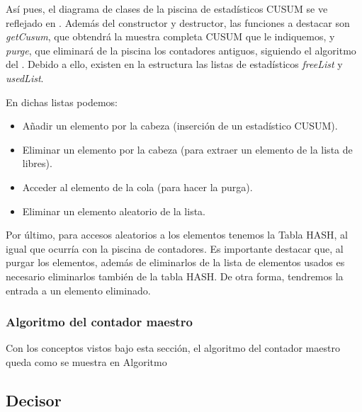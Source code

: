 Así pues, el diagrama de clases de la piscina de estadísticos \gls{CUSUM} se ve reflejado en . 
Además del constructor y destructor, las funciones a destacar son \emph{getCusum}, que obtendrá la muestra completa 
\gls{CUSUM} que le indiquemos, y \emph{purge}, que eliminará de la piscina los contadores antiguos, siguiendo el 
algoritmo del . Debido a ello, existen en la estructura las listas de estadísticos \emph{freeList} 
y \emph{usedList}.

En dichas listas podemos:
\begin{itemize}
 \item Añadir un elemento por la cabeza (inserción de un estadístico CUSUM).
 \item Eliminar un elemento por la cabeza (para extraer un elemento de la lista de libres).
 \item Acceder al elemento de la cola (para hacer la purga).
 \item Eliminar un elemento aleatorio de la lista.
\end{itemize}

Por último, para accesos aleatorios a los elementos tenemos la Tabla HASH, al igual que ocurría con la piscina de 
contadores. Es importante destacar que, al purgar los elementos, además de eliminarlos de la lista de elementos usados 
es necesario eliminarlos también de la tabla HASH. De otra forma, tendremos la entrada a un elemento eliminado.

\subsubsection{Algoritmo del contador maestro}

Con los conceptos vistos bajo esta sección, el algoritmo del contador maestro queda como se muestra en Algoritmo 



\subsection{Decisor}


